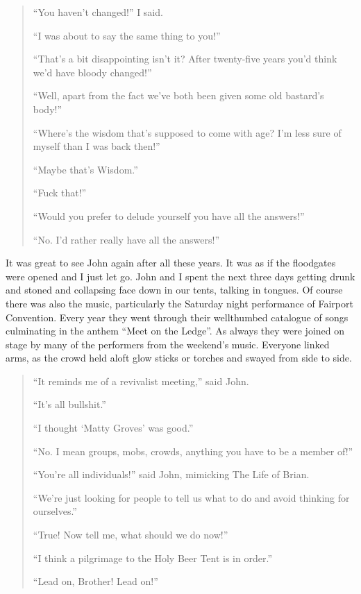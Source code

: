 \documentclass[12pt]{memoir}
\begin{document}
\begin{quote}
“You haven’t changed!” I said.

“I was about to say the same thing to you!”

“That’s a bit disappointing isn’t it?
After twenty-five years you’d think we’d have bloody changed!”

“Well, apart from the fact we’ve both been given some old bastard’s body!”

“Where’s the wisdom that’s supposed to come with age?
I’m less sure of myself than I was back then!”

“Maybe that’s Wisdom.”

“Fuck that!”

“Would you prefer to delude yourself you have all the answers!”

“No. I’d rather really have all the answers!”
\end{quote}

It was great to see John again after all these years.
It was as if the floodgates were opened and I just let go.
John and I spent the next three days getting drunk and stoned
and collapsing face down in our tents, talking in tongues.
Of course there was also the music,
particularly the Saturday night performance of Fairport Convention.
Every year they went through their well\–thumbed catalogue of songs
culminating in the anthem “Meet on the Ledge”.
As always they were joined on stage by many
of the performers from the weekend’s music.
Everyone linked arms, as the crowd held aloft glow sticks
or torches and swayed from side to side.

\begin{quote}
“It reminds me of a revivalist meeting,” said John.

“It’s all bullshit.”

“I thought ‘Matty Groves’ was good.”

“No. I mean groups, mobs, crowds, anything you have to be a member of!”

“You’re all individuals!” said John, mimicking The Life of Brian.

“We’re just looking for people to tell us
what to do and avoid thinking for ourselves.”

“True! Now tell me, what should we do now!”

“I think a pilgrimage to the Holy Beer Tent is in order.”

“Lead on, Brother! Lead on!”
\end{quote}


\end{document}
